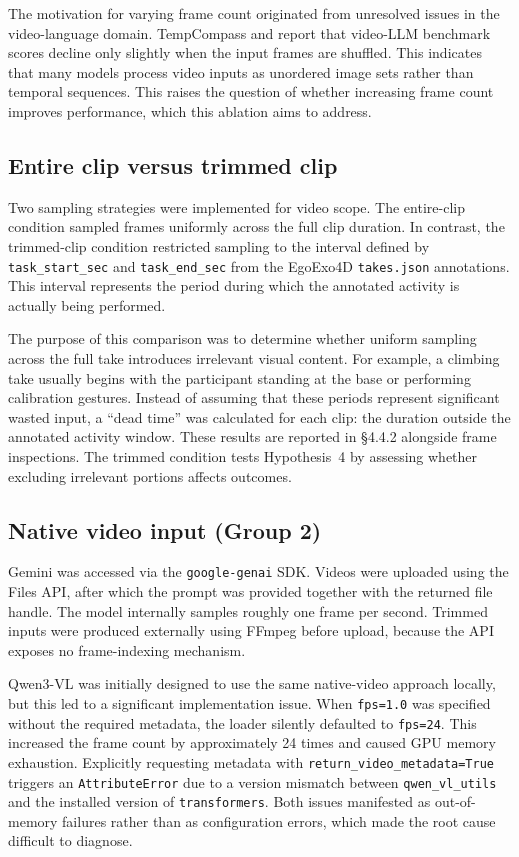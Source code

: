 \documentclass[logo,msc]{infthesis}
\begin{document}
The motivation for varying frame count originated from unresolved issues in
the video-language domain. TempCompass \citep{liu2024tempcompass} and
\citet{feng2025} report that video-LLM benchmark scores decline only
slightly when the input frames are shuffled. This indicates that many
models process video inputs as unordered image sets rather than temporal
sequences. This raises the question of whether increasing frame count
improves performance, which this ablation aims to address.

\subsection{Entire clip versus trimmed clip}

Two sampling strategies were implemented for video scope. The entire-clip
condition sampled frames uniformly across the full clip duration. In
contrast, the trimmed-clip condition restricted sampling to the interval
defined by \texttt{task\_start\_sec} and \texttt{task\_end\_sec} from the
EgoExo4D \texttt{takes.json} annotations. This interval represents the
period during which the annotated activity is actually being performed.

The purpose of this comparison was to determine whether uniform sampling
across the full take introduces irrelevant visual content. For example, a
climbing take usually begins with the participant standing at the base or
performing calibration gestures. Instead of assuming that these periods
represent significant wasted input, a ``dead time'' was calculated for each
clip: the duration outside the annotated activity window. These results are
reported in §4.4.2 alongside frame inspections. The trimmed condition tests
Hypothesis~4 by assessing whether excluding irrelevant portions affects
outcomes.

\subsection{Native video input (Group 2)}

Gemini was accessed via the \texttt{google-genai} SDK. Videos were uploaded
using the Files API, after which the prompt was provided together with the
returned file handle. The model internally samples roughly one frame per
second. Trimmed inputs were produced externally using FFmpeg before upload,
because the API exposes no frame-indexing mechanism.

Qwen3-VL was initially designed to use the same native-video approach
locally, but this led to a significant implementation issue. When
\texttt{fps=1.0} was specified without the required metadata, the loader
silently defaulted to \texttt{fps=24}. This increased the frame count by
approximately 24 times and caused GPU memory exhaustion. Explicitly
requesting metadata with \texttt{return\_video\_metadata=True} triggers an
\texttt{AttributeError} due to a version mismatch between
\texttt{qwen\_vl\_utils} and the installed version of
\texttt{transformers}. Both issues manifested as out-of-memory failures
rather than as configuration errors, which made the root cause difficult to
diagnose.
\end{document}
